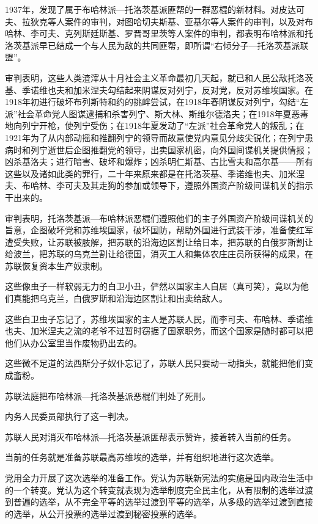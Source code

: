 1937年，发现了属于布哈林派—托洛茨基派匪帮的一群恶棍的新材料。对皮达可夫、拉狄克等人案件的审判，对图哈切夫斯基、亚基尔等人案件的审判，以及对布哈林、李可夫、克列斯廷斯基、罗晋哥里茨等人案件的审判，都表明布哈林派和托洛茨基派早已结成一个与人民为敌的共同匪帮，即所谓“右倾分子—托洛茨基派联盟”。

审判表明，这些人类渣滓从十月社会主义革命最初几天起，就已和人民公敌托洛茨基、季诺维也夫和加米涅夫勾结起来阴谋反对列宁，反对党，反对苏维埃国家。在1918年初进行破坏布列斯特和约的挑衅尝试，在1918年春阴谋反对列宁，勾结“左派”社会革命党人图谋逮捕和杀害列宁、斯大林、斯维尔德洛夫；在1918年夏恶毒地向列宁开枪，使列宁受伤；在1918年夏发动了“左派”社会革命党人的叛乱；在1921年为了从内部动摇和推翻列宁的领导而故意使党内意见分歧尖锐化；在列宁患病时和列宁逝世后企图推翻党的领导，出卖国家机密，向外国间谍机关提供情报；凶杀基洛夫；进行暗害、破坏和爆炸；凶杀明仁斯基、古比雪夫和高尔基——所有这些以及诸如此类的罪行，二十年来原来都是在托洛茨基、季诺维也夫、加米涅夫、布哈林、李可夫及其走狗的参加或领导下，遵照外国资产阶级间谍机关的指示干出来的。

审判表明，托洛茨基派—布哈林派恶棍们遵照他们的主子外国资产阶级间谍机关的旨意，企图破坏党和苏维埃国家，破坏国防，帮助外国进行武装干涉，准备使红军遭受失败，让苏联被肢解，把苏联的沿海边区割让给日本，把苏联的白俄罗斯割让给波兰，把苏联的乌克兰割让给德国，消灭工人和集体农庄庄员所获得的成果，在苏联恢复资本生产奴隶制。

这些像虫子一样软弱无力的白卫小丑，俨然以国家主人自居（真可笑），竟以为他们真能把乌克兰，白俄罗斯和沿海边区割让和出卖给敌人。

这些白卫虫子忘记了，苏维埃国家的主人是苏联人民，而李可夫、布哈林、季诺维也夫、加米涅夫之流的老爷不过暂时窃据了国家职务，而这个国家是随时都可以把他们从办公室里当作废物扔出去的。

这些微不足道的法西斯分子奴仆忘记了，苏联人民只要动一动指头，就能把他们变成齑粉。

苏联法庭把布哈林派—托洛茨基派恶棍们判处了死刑。

内务人民委员部执行了这一判决。

苏联人民对消灭布哈林派―托洛茨基派匪帮表示赞许，接着转入当前的任务。

当前的任务就是准备苏联最高苏维埃的选举，并有组织地进行这次选举。

党用全力开展了这次选举的准备工作。党认为苏联新宪法的实施是国内政治生活中的一个转变。党认为这个转变就表现为选举制度完全民主化，从有限制的选举过渡到普遍的选举，从不完全平等的选举过渡到平等的选举，从多级的选举过渡到直接的选举，从公开投票的选举过渡到秘密投票的选举。

